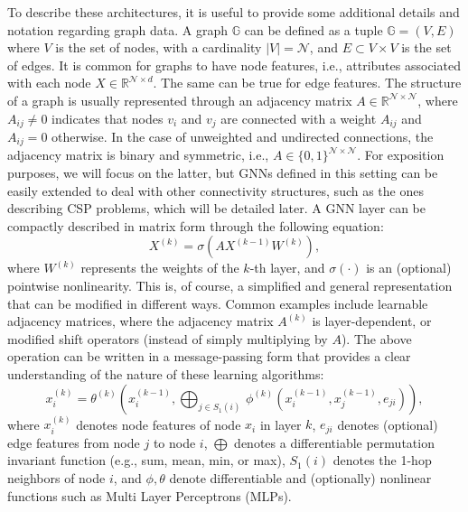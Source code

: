 \documentclass{article}
\begin{document}
To describe these architectures, it is useful to provide some additional details and notation regarding graph data. A graph $\mathbb{G}$ can be defined as a tuple $\mathbb{G} = (V, E)$ where $V$ is the set of nodes, with a cardinality $|V| = \mathcal{N}$, and $E \subset V \times V$ is the set of edges. It is common for graphs to have node features, i.e., attributes associated with each node $X \in \mathbb{R}^{\mathcal{N} \times d}$. The same can be true for edge features. The structure of a graph is usually represented through an adjacency matrix $A \in \mathbb{R}^{\mathcal{N} \times \mathcal{N}}$, where $A_{ij} \neq 0$ indicates that nodes $v_i$ and $v_j$ are connected with a weight $A_{ij}$ and $A_{ij} = 0$ otherwise. In the case of unweighted and undirected connections, the adjacency matrix is binary and symmetric, i.e., $A \in \{0,1\}^{\mathcal{N} \times \mathcal{N}}$. For exposition purposes, we will focus on the latter, but GNNs defined in this setting can be easily extended to deal with other connectivity structures, such as the ones describing CSP problems, which will be detailed later. A GNN layer can be compactly described in matrix form through the following equation:
\begin{equation} \label{eq:graphconv}
    X^{(k)} = \sigma(AX^{(k-1)}W^{(k)}),
\end{equation}
where $W^{(k)}$ represents the weights of the $k$-th layer, and $\sigma(\cdot)$ is an (optional) pointwise nonlinearity. This is, of course, a simplified and general representation that can be modified in different ways. Common examples include learnable adjacency matrices, where the adjacency matrix $A^{(k)}$ is layer-dependent, or modified shift operators (instead of simply multiplying by $A$). The above operation can be written in a message-passing form that provides a clear understanding of the nature of these learning algorithms:
\begin{equation}\label{eq:msg-passing}
    x_i^{(k)} = \theta^{(k)} \left( x_i^{(k-1)}, \bigoplus_{j \in S_1 (i)} \, \phi^{(k)}\left(x_i^{(k-1)}, x_j^{(k-1)},e_{ji}\right) \right),
\end{equation}
where ${x}_i^{(k)}$ denotes node features of node $x_i$ in layer $k$, $e_{ji}$ denotes (optional) edge features from node $j$ to node $i$, $\bigoplus$ denotes a differentiable permutation invariant function (e.g., sum, mean, min, or max), $S_1(i)$ denotes the 1-hop neighbors of node $i$, and $\phi, \theta$ denote differentiable and (optionally) nonlinear functions such as Multi Layer Perceptrons (MLPs).
\end{document}
